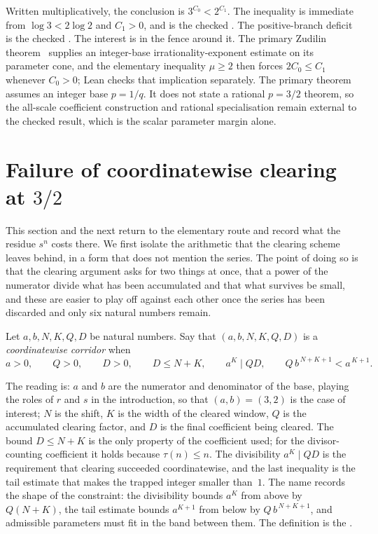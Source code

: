 \documentclass[11pt]{article}
\begin{document}
\noindent Written multiplicatively, the conclusion is \(3^{C_0}<2^{C_1}\).  The
inequality is immediate from \(\log3<2\log2\) and \(C_1>0\), and
is the checked
.  The positive-branch deficit is the checked
.
The interest is in the fence around it.  The primary Zudilin
theorem~\cite[Theorem~1, p.~154; Sec.~5, pp.~161--162]{zudilin2004} supplies an integer-base
irrationality-exponent estimate on its parameter cone, and the elementary
inequality \(\mu\ge2\) then forces \(2C_0\le C_1\) whenever \(C_0>0\); Lean
checks that implication separately.  The primary theorem assumes an integer
base \(p=1/q\).  It does not state a rational \(p=3/2\) theorem, so the
all-scale coefficient construction and rational specialisation remain
external to the checked result, which is the scalar parameter margin alone.

\section{Failure of coordinatewise clearing at $3/2$}\label{sec:corridor}

This section and the next return to the elementary route and record what the
residue $s^{n}$ costs there.  We first isolate the arithmetic that the clearing
scheme leaves behind, in a form that does not mention the series.  The point of
doing so is that the clearing argument asks for two things at once, that a
power of the numerator divide what has been accumulated and that what survives
be small, and these are easier to play off against each other once the series
has been discarded and only six natural numbers remain.

\begin{definition}\label{def:corridor}
Let $a,b,N,K,Q,D$ be natural numbers.  Say that $(a,b,N,K,Q,D)$ is a
\emph{coordinatewise corridor} when
\[
 a>0,\qquad Q>0,\qquad D>0,\qquad D\le N+K,\qquad
 a^{K}\mid QD,\qquad Q\,b^{\,N+K+1}<a^{\,K+1}.
\]
\end{definition}

\noindent The reading is: $a$ and $b$ are the numerator and denominator of the
base, playing the roles of $r$ and $s$ in the introduction, so that
$(a,b)=(3,2)$ is the case of interest;
$N$ is the shift, $K$ is the width of the cleared window, $Q$ is the
accumulated clearing factor, and $D$ is the final coefficient being cleared.
The bound $D\le N+K$ is the only property of the coefficient used; for the
divisor-counting coefficient it holds because $\tau(n)\le n$.  The divisibility
$a^{K}\mid QD$ is the requirement that clearing succeeded coordinatewise, and
the last inequality is the tail estimate that makes the trapped integer smaller
than~$1$.  The name records the shape of the constraint: the divisibility
bounds $a^{K}$ from above by $Q(N+K)$, the tail estimate bounds $a^{K+1}$ from
below by $Q\,b^{\,N+K+1}$, and admissible parameters must fit in the band
between them.  The definition is the
.
\end{document}
